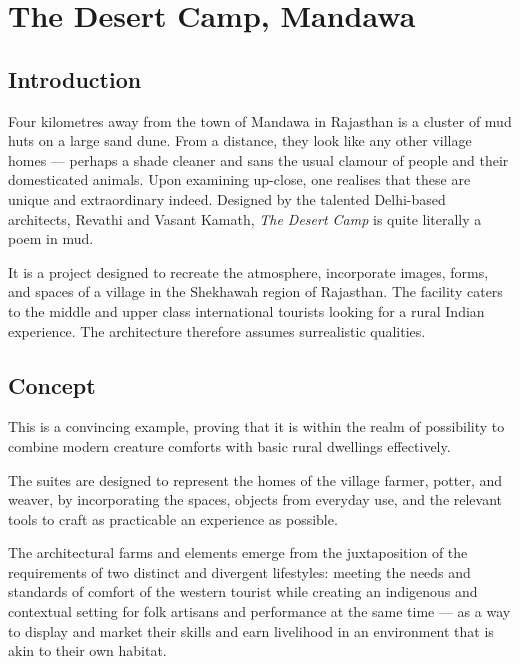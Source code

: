 \section{The Desert Camp, Mandawa} %
\label{sec:dcm}

\subsection{Introduction} %
\label{sub:dcm_intro}

Four kilometres away from the town of Mandawa in Rajasthan is a cluster of mud huts on a large sand dune. From a distance, they look like any other village homes --- perhaps a shade cleaner and sans the usual clamour of people and their domesticated animals. Upon examining up-close, one realises that these are unique and extraordinary indeed. Designed by the talented Delhi-based architects, Revathi and Vasant Kamath, \emph{The Desert Camp} is quite literally a poem in mud.

It is a project designed to recreate the atmosphere, incorporate images, forms, and spaces of a village in the Shekhawah region of Rajasthan. The facility caters to the middle and upper class international tourists looking for a rural Indian experience. The architecture therefore assumes surrealistic qualities.


\subsection{Concept} %
\label{sub:dcm_concept}

This is a convincing example, proving that it is within the realm of possibility to combine modern creature comforts with basic rural dwellings effectively.

The suites are designed to represent the homes of the village farmer, potter, and weaver, by incorporating the spaces, objects from everyday use, and the relevant tools to craft as practicable an experience as possible.

The architectural farms and elements emerge from the juxtaposition of the requirements of two distinct and divergent lifestyles: meeting the needs and standards of comfort of the western tourist while creating an indigenous and contextual setting for folk artisans and performance at the same time --- as a way to display and market their skills and earn livelihood in an environment that is akin to their own habitat.

